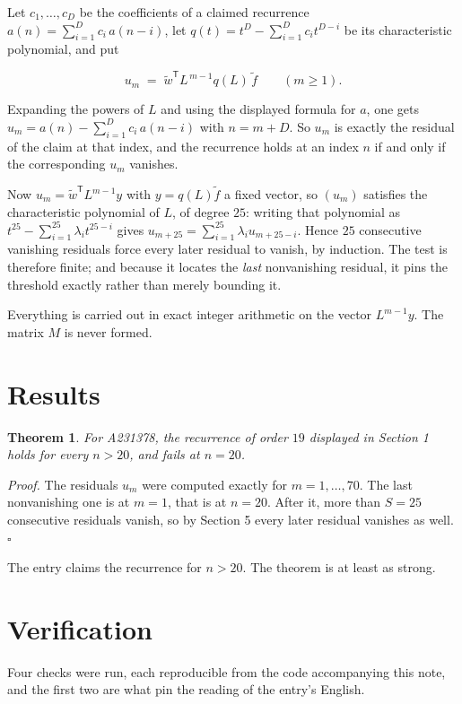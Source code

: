 \documentclass[11pt]{article}
\newtheorem{theorem}{Theorem}
\theoremstyle{definition}
\begin{document}
Let $c_1,\dots,c_D$ be the coefficients of a claimed recurrence $a(n) = \sum_{i=1}^{D} c_i\,a(n-i)$, let $q(t) = t^{D} - \sum_{i=1}^{D} c_i t^{D-i}$ be its characteristic polynomial, and put

\[u_m \;=\; \tilde w^{\mathsf T} L^{\,m-1} q(L)\,\tilde f \qquad (m \ge 1).\]

Expanding the powers of $L$ and using the displayed formula for $a$, one gets $u_m = a(n) - \sum_{i=1}^{D} c_i\,a(n-i)$ with $n = m + D$. So $u_m$ is exactly the residual of the claim at that index, and the recurrence holds at an index $n$ if and only if the corresponding $u_m$ vanishes.

Now $u_m = \tilde w^{\mathsf T} L^{m-1} y$ with $y = q(L)\tilde f$ a fixed vector, so $(u_m)$ satisfies the characteristic polynomial of $L$, of degree $25$: writing that polynomial as $t^{25} - \sum_{i=1}^{25} \lambda_i t^{25-i}$ gives $u_{m+25} = \sum_{i=1}^{25} \lambda_i u_{m+25-i}$. Hence $25$ consecutive vanishing residuals force every later residual to vanish, by induction. The test is therefore finite; and because it locates the {\itshape last} nonvanishing residual, it pins the threshold exactly rather than merely bounding it.

Everything is carried out in exact integer arithmetic on the vector $L^{m-1}y$. The matrix $M$ is never formed.

\section{Results}

\begin{theorem} For A231378, the recurrence of order $19$ displayed in Section 1 holds for every $n > 20$, and fails at $n = 20$.\end{theorem}

{\itshape Proof.} The residuals $u_m$ were computed exactly for $m = 1,\dots,70$. The last nonvanishing one is at $m = 1$, that is at $n = 20$. After it, more than $S = 25$ consecutive residuals vanish, so by Section 5 every later residual vanishes as well. $\square$

The entry claims the recurrence for $n > 20$. The theorem is at least as strong.

\section{Verification}

Four checks were run, each reproducible from the code accompanying this note, and the first two are what pin the reading of the entry's English.
\end{document}
